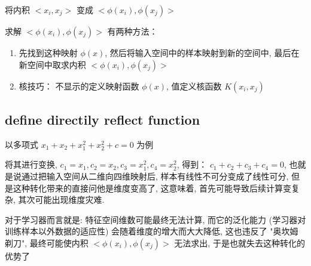 \documentclass[oneside, 12pt]{ctexbook}
\begin{document}
			将内积 $<x_i, x_j>$ 变成 $<\phi(x_i), \phi(x_j)>$
			
			求解 $<\phi(x_i), \phi(x_j)>$ 有两种方法：
				\begin{enumerate}
					\item 先找到这种映射 $\phi(x)$, 然后将输入空间中的样本映射到新的空间中, 最后在新空间中取求内积 $<\phi(x_i), \phi(x_j)>$
					
					\item 核技巧： 不显示的定义映射函数 $\phi(x)$, 值定义核函数 $K(x_i, x_j)$
				\end{enumerate}
			
			\subsection{\quad define directily reflect function}
				以多项式 $x_1 + x_2 + x_1^2 + x_2^2 + c = 0$ 为例
				
				将其进行变换, $c_1 = x_1, c_2 = x_2, c_3 = x_1^2, c_4 = x_2^2$, 得到：
				$c_1 + c_2 + c_3 + c_4 = 0$, 也就是说通过把输入空间从二维向四维映射后, 样本有线性不可分变成了线性可分, 但是这种转化带来的直接问他是维度变高了, 这意味着, 首先可能导致后续计算变复杂, 其次可能出现维度灾难.
				
				对于学习器而言就是: 特征空间维数可能最终无法计算, 而它的泛化能力 (学习器对训练样本以外数据的适应性) 会随着维度的增大而大大降低, 这也违反了 "奥坎姆剃刀", 最终可能使内积 $<\phi(x_i), \phi(x_j)>$ 无法求出, 于是也就失去这种转化的优势了
				
				
\end{document}
